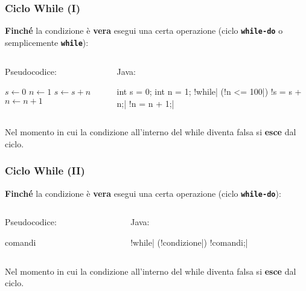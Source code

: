 \begin{frame}[fragile]\frametitle{Ciclo While (I)}
  \textbf{Finché} la condizione è \textbf{vera} esegui una certa operazione (ciclo \textbf{\texttt{while-do}}
  o semplicemente \textbf{\texttt{while}}):
  \begin{columns}[T]
    \begin{column}[T]{5cm}
      Pseudocodice:
      \begin{algorithmic}[1]     
	\State $s \gets 0$
	\State $n \gets 1$
	  \State $s \gets s + n$
	  \State $n \gets n + 1$
	\EndWhile
      \end{algorithmic}
    \end{column}
    \begin{column}[T]{5cm}
      Java:
      \begin{JavaCodePlain}[commandchars=\\!|]
	int s = 0;
	int n = 1;
	\Word!while| (\Green!n <= 100|) {
	  \Red!s = s + n;|
	  \Red!n = n + 1;|
	}
      \end{JavaCodePlain}
    \end{column}
  \end{columns}
  ${}$\\
  Nel momento in cui la condizione all'interno del while diventa falsa si \textbf{esce} dal ciclo.
\end{frame}

\begin{frame}[fragile]\frametitle{Ciclo While (II)}
  \textbf{Finché} la condizione è \textbf{vera} esegui una certa operazione (ciclo \textbf{\texttt{while-do}}):
  \begin{columns}[T]
    \begin{column}[T]{5cm}
      Pseudocodice:
      \begin{algorithmic}[1]     
	  \State comandi
	\EndWhile
      \end{algorithmic}
    \end{column}
    \begin{column}[T]{5cm}
      Java:
      \begin{JavaCodePlain}[commandchars=\\!|]
	\Word!while| (\Green!condizione|) {
	  \Red!comandi;|
	}
      \end{JavaCodePlain}
    \end{column}
  \end{columns}
  ${}$\\
  Nel momento in cui la condizione all'interno del while diventa falsa si \textbf{esce} dal ciclo.
\end{frame}

